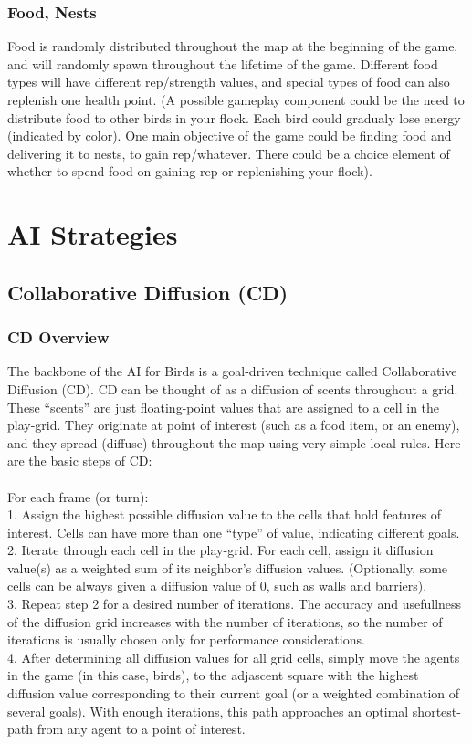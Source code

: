 \documentclass{article}
\begin{document}
\subsubsection{Food, Nests}
Food is randomly distributed throughout the map at the beginning of the game, and will randomly spawn throughout the lifetime of the game.  Different food types will have different rep/strength values, and special types of food can also replenish one health point. (A possible gameplay component could be the need to distribute food to other birds in your flock.  Each bird could gradualy lose energy (indicated by color).  One main objective of the game could be finding food and delivering it to nests, to gain rep/whatever.  There could be a choice element of whether to spend food on gaining rep or replenishing your flock).

\section{AI Strategies}
\subsection{Collaborative Diffusion (CD)}
\subsubsection{CD Overview}
The backbone of the AI for Birds is a goal-driven technique called Collaborative Diffusion (CD).  CD can be thought of as a diffusion of scents throughout a grid.  These ``scents'' are just floating-point values that are assigned to a cell in the play-grid.  They originate at point of interest (such as a food item, or an enemy), and they spread (diffuse) throughout the map using very simple local rules.  Here are the basic steps of CD:
\\\\
For each frame (or turn):
\\
1. Assign the highest possible diffusion value to the cells that hold features of interest.  Cells can have more than one ``type'' of value, indicating different goals.
\\
2. Iterate through each cell in the play-grid.  For each cell, assign it diffusion value(s) as a weighted sum of its neighbor's diffusion values. (Optionally, some cells can be always given a diffusion value of $0$, such as walls and barriers).
\\
3. Repeat step 2 for a desired number of iterations.  The accuracy and usefullness of the diffusion grid increases with the number of iterations, so the number of iterations is usually chosen only for performance considerations.
\\
4. After determining all diffusion values for all grid cells, simply move the agents in the game (in this case, birds), to the adjascent square with the highest diffusion value corresponding to their current goal (or a weighted combination of several goals).  With enough iterations, this path approaches an optimal shortest-path from any agent to a point of interest.
\end{document}
